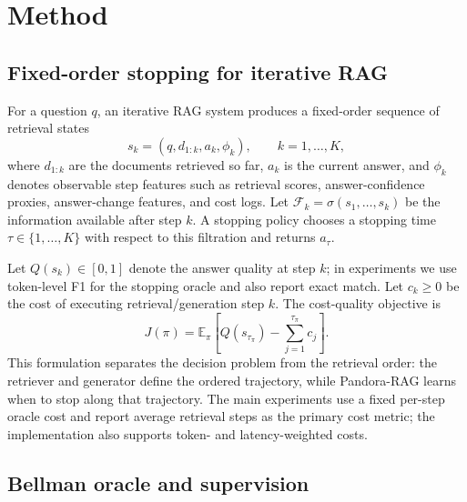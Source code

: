 \documentclass{article}
\newcommand{\method}{Pandora-RAG}
\begin{document}
\section{Method}
\label{sec:method}

\subsection{Fixed-order stopping for iterative RAG}
\label{sec:problem}

For a question $q$, an iterative RAG system produces a fixed-order sequence of retrieval states
\[
  s_k=(q,d_{1:k},a_k,\phi_k), \qquad k=1,\ldots,K,
\]
where $d_{1:k}$ are the documents retrieved so far, $a_k$ is the current answer, and $\phi_k$ denotes observable step features such as retrieval scores, answer-confidence proxies, answer-change features, and cost logs. Let $\mathcal{F}_k=\sigma(s_1,\ldots,s_k)$ be the information available after step $k$. A stopping policy chooses a stopping time $\tau\in\{1,\ldots,K\}$ with respect to this filtration and returns $a_\tau$.

Let $Q(s_k)\in[0,1]$ denote the answer quality at step $k$; in experiments we use token-level F1 for the stopping oracle and also report exact match. Let $c_k\ge 0$ be the cost of executing retrieval/generation step $k$. The cost-quality objective is
\begin{equation}
  J(\pi)
  =
  \mathbb{E}_{\pi}\left[
    Q(s_{\tau_\pi})-\sum_{j=1}^{\tau_\pi}c_j
  \right].
  \label{eq:utility}
\end{equation}
This formulation separates the decision problem from the retrieval order: the retriever and generator define the ordered trajectory, while \method{} learns when to stop along that trajectory. The main experiments use a fixed per-step oracle cost and report average retrieval steps as the primary cost metric; the implementation also supports token- and latency-weighted costs.

\subsection{Bellman oracle and supervision}
\label{sec:bellman-oracle}
\end{document}
